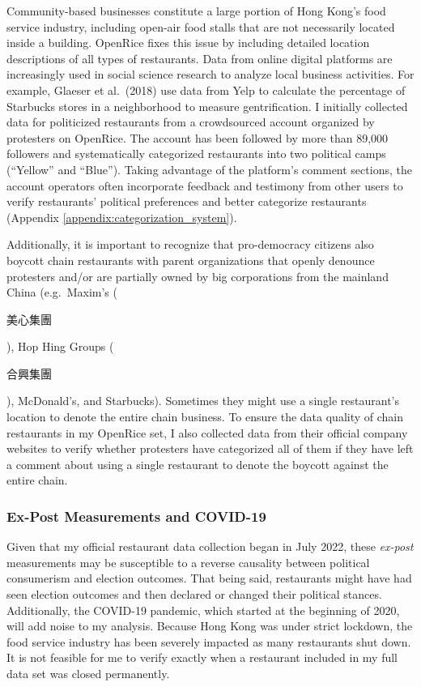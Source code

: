 \documentclass[letterpaper, 12pt]{article}
\begin{document}
Community-based businesses constitute a large portion of Hong Kong's food service industry, including open-air food stalls that are not necessarily located inside a building. OpenRice fixes this issue by including detailed location descriptions of all types of restaurants. Data from online digital platforms are increasingly used in social science research to analyze local business activities. For example, Glaeser et al.\ (2018) use data from Yelp to calculate the percentage of Starbucks stores in a neighborhood to measure gentrification. I initially collected data for politicized restaurants from a crowdsourced account organized by protesters on OpenRice. The account has been followed by more than 89,000 followers and systematically categorized restaurants into two political camps (``Yellow'' and ``Blue''). Taking advantage of the platform's comment sections, the account operators often incorporate feedback and testimony from other users to verify restaurants' political preferences and better categorize restaurants (Appendix \ref{appendix:categorization_system}). 

Additionally, it is important to recognize that pro-democracy citizens also boycott chain restaurants with parent organizations that openly denounce protesters and/or are partially owned by big corporations from the mainland China (e.g.\ Maxim's (\begin{CJK*}{UTF8}{bkai}美心集團\end{CJK*}), Hop Hing Groups (\begin{CJK*}{UTF8}{bkai}合興集團\end{CJK*}), McDonald's, and Starbucks). Sometimes they might use a single restaurant's location to denote the entire chain business. To ensure the data quality of chain restaurants in my OpenRice set, I also collected data from their official company websites to verify whether protesters have categorized all of them if they have left a comment about using a single restaurant to denote the boycott against the entire chain.

\subsubsection{Ex-Post Measurements and COVID-19}
Given that my official restaurant data collection began in July 2022, these \textit{ex-post} measurements may be susceptible to a reverse causality between political consumerism and election outcomes. That being said, restaurants might have had seen election outcomes and then declared or changed their political stances. Additionally, the COVID-19 pandemic, which started at the beginning of 2020, will add noise to my analysis. Because Hong Kong was under strict lockdown, the food service industry has been severely impacted as many restaurants shut down. It is not feasible for me to verify exactly when a restaurant included in my full data set was closed permanently. 
\end{document}
